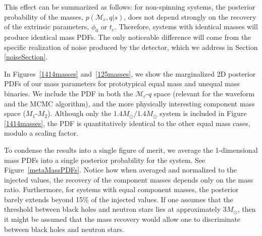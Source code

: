 \documentclass[11pt,a4paper]{emulateapj} 
\newcommand{\carl}[1]{{\color{red} #1}}
\newcommand{\chmass}{\mathcal{M}_c}
\begin{document}
This effect can be summarized as follows: for non-spinning systems,
the posterior probability of the masses, $p(\chmass, q | s)$, does not
depend strongly on the recovery of the extrinsic parameters, $\phi_0$
or $t_c$.  Therefore, systems with identical masses will produce
identical mass PDFs.  The only noticeable difference will come from
the specific realization of noise produced by the detector, which we
address in Section \ref{noiseSection}.




In Figures~\ref{1414masses} and~\ref{125masses}, we show the
marginalized 2D posterior PDFs of our mass parameters for prototypical
equal mass and unequal mass binaries.  We include the PDF in both the
$\chmass$-$q$ space (relevant for the waveform and the MCMC
algorithm), and the more physically interesting component mass space
($M_1$-$M_2$).  Although only the $1.4M_{\odot}/1.4M_{\odot}$ system
is included in Figure \ref{1414masses}, the PDF is quantitatively
identical to the other equal mass cases, modulo a scaling factor.

To condense the results into a single figure of merit, we average the
1-dimensional mass PDFs into a single posterior probability for the
system.  See Figure~\ref{metaMassPDFs}.  Notice how when averaged and
normalized to the injected values, the recovery of the component
masses depends only on the mass ratio.  Furthermore, for systems with
equal component masses, the posterior barely extends beyond 15\% of
the injected values.  If one assumes that the threshold between black
holes and neutron stars lies at approximately $3M_{\odot}$, then it
might be assumed that the mass recovery would allow one to
discriminate between black holes and neutron stars.
   
\end{document}
